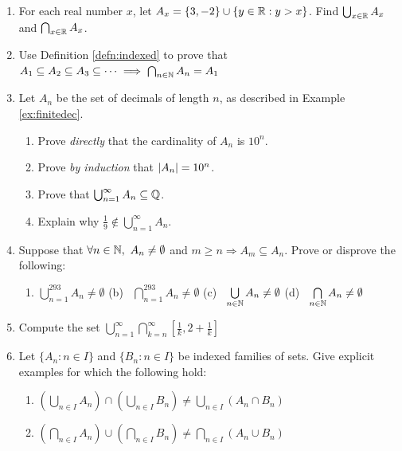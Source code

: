 \begin{exercises}{}{}
\begin{enumerate}
	
	  \item For each real number $x$, let $A_x=\{3,-2\}\cup\{y\in\mathbb{R}:y>x\}$. Find $\bigcup_{x\in\mathbb{R}}A_x$ and $\bigcap_{x\in\mathbb{R}}A_x$.
	  
	  
	  \item Use Definition \ref{defn:indexed} to prove that $A_1\subseteq A_2\subseteq A_3\subseteq\cdots\implies \bigcap_{n\in\mathbb{N}}A_n=A_1$
		
	
			
			
		\item Let $A_n$ be the set of decimals of length $n$, as described in Example \ref{ex:finitedec}.
		\begin{enumerate}
		  \item Prove \emph{directly} that the cardinality of $A_n$ is $10^n$. 
		  \item Prove \emph{by induction} that $\left| A_n\right|=10^n$.
		  \item Prove that $\bigcup_{n=1}^\infty A_n\subseteq\mathbb{Q}$.
			\item Explain why $\frac 19\notin\bigcup_{n=1}^\infty A_n$.
		\end{enumerate}
	
	
	  \item Suppose that $\forall n\in\N,\ A_n\neq\emptyset$ and $m\ge n\Longrightarrow A_m\subseteq A_n$. Prove or disprove the following:
	  \begin{enumerate}
	    \item $\bigcup\limits_{n=1}^{293}A_n\neq\emptyset$\qquad\quad 
	    (b) \ $\bigcap\limits_{n=1}^{293}A_n\neq\emptyset$\qquad\quad
	    (c) \ $\bigcup\limits_{n\in\mathbb{N}} A_n\neq\emptyset$\qquad\quad 
	    (d) \ $\bigcap\limits_{n\in\mathbb{N}} A_n\neq\emptyset$
		\end{enumerate}
		
		
		\item Compute the set $\bigcup_{n=1}^\infty\bigcap_{k=n}^\infty [\frac 1k,2+\frac 1k]$
		
		
		\item Let $\{A_n:n\in I\}$ and $\{B_n:n\in I\}$ be indexed families of sets. Give explicit examples for which the following hold:
		\begin{enumerate}
	    \item $\left(\bigcup_{n\in I} A_n\right) \cap \left(\bigcup_{n\in I}B_n\right) \neq \bigcup_{n\in I} (A_n \cap B_n)$
	    \item $\left(\bigcap_{n\in I} A_n\right) \cup \left(\bigcap_{n\in I}B_n\right) \neq \bigcap_{n\in I} (A_n \cup B_n)$
		\end{enumerate}
	

\end{enumerate}
\end{exercises}
